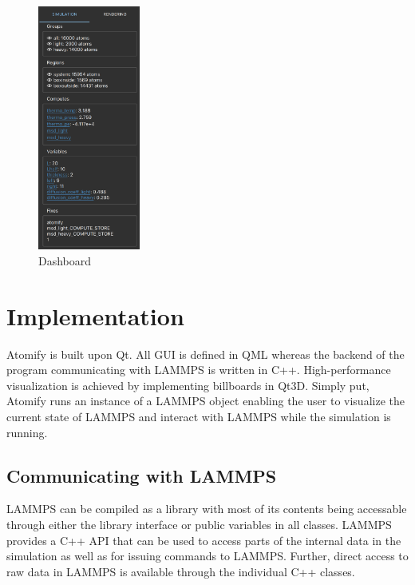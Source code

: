 \documentclass[aps,pre,twocolumn,letterpaper,floatfix,nofootinbib]{revtex4}
\begin{document}
\begin{figure}
	\centering
	\includegraphics[width=0.3\textwidth]{dashboard.png}
	\caption{Dashboard}
	\label{fig:dashboard}
\end{figure}


\section{Implementation}

Atomify is built upon Qt.
All GUI is defined in QML whereas the backend of the program communicating with
LAMMPS is written in C++.
High-performance visualization is achieved by implementing billboards in Qt3D.
Simply put, Atomify runs an instance of a LAMMPS object enabling the user to
visualize the current state of LAMMPS and interact with LAMMPS while the
simulation is running.

\subsection{Communicating with LAMMPS}

LAMMPS can be compiled as a library with most of its contents being accessable
through either the library interface or public variables in all classes.
LAMMPS provides a C++ API that can be used to access parts of the internal data
in the simulation as well as for issuing commands to LAMMPS.
Further, direct access to raw data in LAMMPS is available through the individual
C++ classes.
\end{document}
